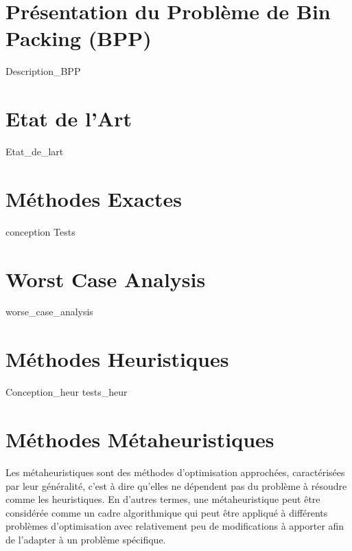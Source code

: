 \documentclass[12pt,a4paper, titlepage]{report}
\begin{document}
    \part{Présentation du Problème de Bin Packing (BPP) }
    {Description_BPP}
    \part{Etat de l'Art }
    {Etat_de_lart}
    \part{Méthodes Exactes}
    {conception}
    {Tests}
    \part{Worst Case Analysis }
    {worse_case_analysis}
    \newpage
    \part{Méthodes Heuristiques}
    {Conception_heur}
    {tests_heur}
    \part{Méthodes Métaheuristiques}
        Les métaheuristiques sont des méthodes d’optimisation approchées, caractérisées par leur généralité, c’est à dire qu’elles ne dépendent pas du problème à résoudre comme les heuristiques. En d'autres termes, une métaheuristique peut être considérée comme un
    cadre algorithmique qui peut être appliqué à différents problèmes d'optimisation avec relativement peu de modifications à apporter afin de l’adapter à un problème spécifique.
\end{document}
